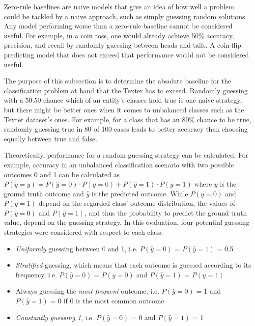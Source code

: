 Zero-rule baselines are naive models that give an idea of how well a problem could be tackled by a naive approach, such as simply guessing random solutions. Any model performing worse than a zero-rule baseline cannot be considered useful. For example, in a coin toss, one would already achieve 50\% accuracy, precision, and recall by randomly guessing between heads and tails. A coin-flip predicting model that does not exceed that performance would not be considered useful.

The purpose of this subsection is to determine the absolute baseline for the classification problem at hand that the Texter has to exceed. Randomly guessing with a 50:50 chance which of an entity's classes hold true is one naive strategy, but there might be better ones when it comes to unbalanced classes such as the Texter dataset's ones. For example, for a class that has an 80\% chance to be true, randomly guessing true in 80 of 100 cases leads to better accuracy than choosing equally between true and false.

Theoretically, performance for a random guessing strategy can be calculated. For example, accuracy in an unbalanced classification scenario with two possible outcomes 0 and 1 can be calculated as $P(\hat{y} = y) = P(\hat{y} = 0) \cdot P(y = 0) + P(\hat{y} = 1) \cdot P(y = 1)$ where $y$ is the ground truth outcome and $\hat{y}$ is the predicted outcome. While $P(y = 0)$ and $P(y = 1)$ depend on the regarded class' outcome distribution, the values of $P(\hat{y} = 0)$ and $P(\hat{y} = 1)$, and thus the probability to predict the ground truth value, depend on the guessing strategy. In this evaluation, four potential guessing strategies were considered with respect to each class:

\begin{itemize}
    \item \emph{Uniformly} guessing between 0 and 1, i.e. $P(\hat{y} = 0)$ = $P(\hat{y} = 1)$ = 0.5

    \item \emph{Stratified} guessing, which means that each outcome is guessed according to its frequency, i.e. $P(\hat{y} = 0)$ = $P(y = 0)$ and $P(\hat{y} = 1)$ = $P(y = 1)$

    \item Always guessing the \emph{most frequent} outcome, i.e.  $P(\hat{y} = 0)$ = 1 and $P(\hat{y} = 1)$ = 0 if 0 is the most common outcome

    \item \emph{Constantly guessing 1}, i.e. $P(\hat{y} = 0)$ = 0 and $P(\hat{y} = 1)$ = 1
\end{itemize}

